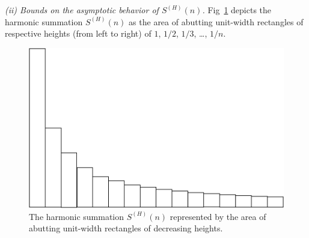 
{\it (ii) Bounds on the asymptotic behavior of $S^{(H)}(n)$.}
%
Fig~\ref{fig:HarmonicSumInitial} depicts the harmonic summation
$S^{(H)}(n)$ as the area of abutting unit-width rectangles of
respective heights (from left to right) of $1$, $1/2$, $1/3$, \ldots,
$1/n$.
\begin{figure}[htb]
\centerline{
\includegraphics[scale=0.3]{FiguresMaths/HarmonicSumInitial}
}
\caption{The harmonic summation $S^{(H)}(n)$ represented by the area
  of abutting unit-width rectangles of decreasing heights.}
\label{fig:HarmonicSumInitial}
\end{figure}

